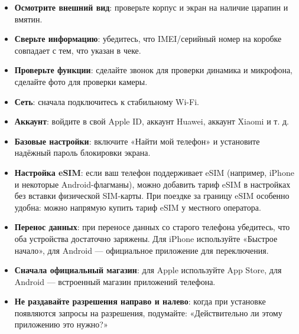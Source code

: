 

\begin{itemize}
  \item \textbf{Осмотрите внешний вид}: проверьте корпус и экран на наличие царапин и вмятин.
  \item \textbf{Сверьте информацию}: убедитесь, что IMEI/серийный номер на коробке совпадает с тем, что указан в чеке.
  \item \textbf{Проверьте функции}: сделайте звонок для проверки динамика и микрофона, сделайте фото для проверки камеры.
\end{itemize}


\begin{itemize}
  \item \textbf{Сеть}: сначала подключитесь к стабильному Wi-Fi.
  \item \textbf{Аккаунт}: войдите в свой Apple ID, аккаунт Huawei, аккаунт Xiaomi и т. д.
  \item \textbf{Базовые настройки}: включите «Найти мой телефон» и установите надёжный пароль блокировки экрана.
  \item \textbf{Настройка eSIM}: если ваш телефон поддерживает eSIM (например, iPhone и некоторые Android-флагманы), можно добавить тариф eSIM в настройках без вставки физической SIM-карты. При поездке за границу eSIM особенно удобна: можно напрямую купить тариф eSIM у местного оператора.
  \item \textbf{Перенос данных}: при переносе данных со старого телефона убедитесь, что оба устройства достаточно заряжены. Для iPhone используйте «Быстрое начало», для Android — официальное приложение для переключения.
\end{itemize}


\begin{itemize}
  \item \textbf{Сначала официальный магазин}: для Apple используйте App Store, для Android — встроенный магазин приложений телефона.
  \item \textbf{Не раздавайте разрешения направо и налево}: когда при установке появляются запросы на разрешения, подумайте: «Действительно ли этому приложению это нужно?»
\end{itemize}
